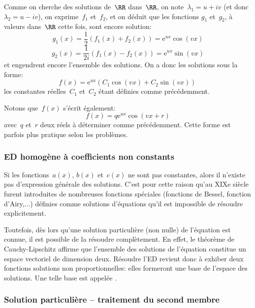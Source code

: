 \medskip
Comme on cherche des solutions de~$\RR$ dans~$\RR$, on note~$\lambda_1 = u + iv$ (et
donc~$\lambda_2 = u-iv$), on exprime~$f_1$ et~$f_2$, et on déduit que les fonctions
$g_1$ et~$g_2$, à valeurs dans~$\RR$ cette fois, sont encore solution:
\begin{equation}
  g_1(x) =\frac 12 (f_1(x) + f_2(x) )= \mathrm{e}^{ux}\cos(vx)
\end{equation}
\begin{equation}
  g_2(x) = \frac{1}{2i}(f_1(x) - f_2(x)) = \mathrm{e}^{ux}\sin(vx) 
\end{equation}
et engendrent encore l'ensemble des solutions.
On a donc les solutions sous la forme:
\begin{equation}
f(x) = \mathrm{e}^{ux}(C_1\cos(vx) + C_2\sin(vx))\,
\end{equation}
les constantes réelles~$C_1$ et~$C_2$ étant définies comme précédemment.

Notons que~$f(x)$ s'écrit également:
\begin{equation}
f(x) = q \mathrm{e}^{ux}\cos(vx+r)
\end{equation}
avec~$q$ et~$r$ deux réels à déterminer comme précédemment.
Cette forme est parfois plus pratique selon les problèmes.


\medskip
\subsubsection{ED homogène à coefficients non constants}

Si les fonctions~$a(x)$, $b(x)$ et~$c(x)$ ne sont pas constantes, alors
il n'existe pas d'expression générale des solutions.
C'est pour cette raison qu'au XIXe siècle furent introduites de nombreuses fonctions spéciales 
(fonctions de Bessel, fonction d'Airy,...) définies comme solutions d'équations qu'il est impossible 
de résoudre explicitement. 

\medskip
Toutefois, dès lors qu'une solution particulière (non nulle) de l'équation est connue,
il est possible de la résoudre complètement.
En effet, le théorème de Cauchy-Lipschitz affirme que l'ensemble des solutions de l'équation 
constitue un espace vectoriel de dimension deux. 
Résoudre l'ED revient donc à exhiber deux fonctions solutions non proportionnelles: elles formeront 
une base de l'espace des solutions. 
Une telle base est appelée .

\medskip
\subsubsection{Solution particulière -- traitement du second membre}


